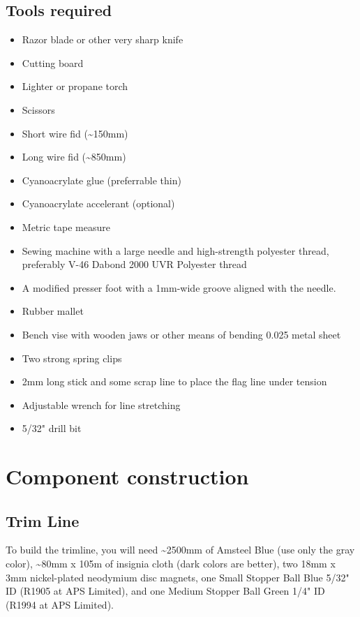 \documentclass[]{book}
\providecommand{\tightlist}{%
  \setlength{\itemsep}{0pt}\setlength{\parskip}{0pt}}
\begin{document}
\hypertarget{tools-required}{%
\section{Tools required}\label{tools-required}}

\begin{itemize}
\tightlist
\item
  Razor blade or other very sharp knife
\item
  Cutting board
\item
  Lighter or propane torch
\item
  Scissors
\item
  Short wire fid (\textasciitilde{}150mm)
\item
  Long wire fid (\textasciitilde{}850mm)
\item
  Cyanoacrylate glue (preferrable thin)
\item
  Cyanoacrylate accelerant (optional)
\item
  Metric tape measure
\item
  Sewing machine with a large needle and high-strength polyester thread, preferably V-46 Dabond 2000 UVR Polyester thread
\item
  A modified presser foot with a 1mm-wide groove aligned with the needle.
\item
  Rubber mallet
\item
  Bench vise with wooden jaws or other means of bending 0.025 metal sheet
\item
  Two strong spring clips
\item
  2mm long stick and some scrap line to place the flag line under tension
\item
  Adjustable wrench for line stretching
\item
  5/32" drill bit
\end{itemize}

\hypertarget{component-construction}{%
\chapter{Component construction}\label{component-construction}}

\hypertarget{trim-line}{%
\section{Trim Line}\label{trim-line}}

To build the trimline, you will need \textasciitilde{}2500mm of Amsteel Blue (use only the gray color), \textasciitilde{}80mm x 105m of insignia cloth (dark colors are better), two 18mm x 3mm nickel-plated neodymium disc magnets, one Small Stopper Ball Blue 5/32" ID (R1905 at APS Limited), and one Medium Stopper Ball Green 1/4" ID (R1994 at APS Limited).
\end{document}
